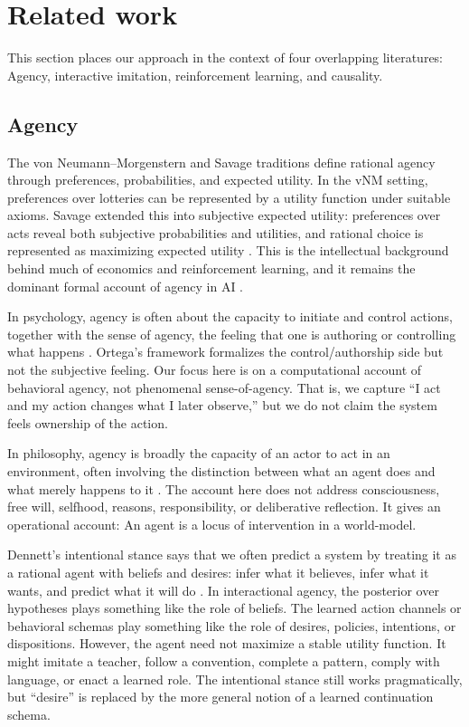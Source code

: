 \documentclass[11pt]{article}
\begin{document}
\section{Related work}
\label{sec:relatedwork}

This section places our approach in the context of four overlapping literatures: Agency, interactive imitation, reinforcement learning, and causality.

\subsection{Agency}
\label{sec:rw-agency}

The von Neumann--Morgenstern and Savage traditions define rational agency through preferences, probabilities, and expected utility. In the vNM setting, preferences over lotteries can be represented by a utility function under suitable axioms. Savage extended this into subjective expected utility: preferences over acts reveal both subjective probabilities and utilities, and rational choice is represented as maximizing expected utility \citep{vonNeumannMorgenstern1944,savage1954,sepDecisionTheory,russell1997rationality}. This is the intellectual background behind much of economics and reinforcement learning, and it remains the dominant formal account of agency in AI \citep{russell2010artificial}.

In psychology, agency is often about the capacity to initiate and control actions, together with the sense of agency, the feeling that one is authoring or controlling what happens \citep{wikiAgencyPsychology,haggard2017sense}. Ortega's framework formalizes the control/authorship side but not the subjective feeling. Our focus here is on a computational account of behavioral agency, not phenomenal sense-of-agency. That is, we capture ``I act and my action changes what I later observe,'' but we do not claim the system feels ownership of the action.

In philosophy, agency is broadly the capacity of an actor to act in an environment, often involving the distinction between what an agent does and what merely happens to it \citep{wikiAgencyPhilosophy,schlosser2019agency}. The account here does not address consciousness, free will, selfhood, reasons, responsibility, or deliberative reflection. It gives an operational account: An agent is a locus of intervention in a world-model.

Dennett's intentional stance says that we often predict a system by treating it as a rational agent with beliefs and desires: infer what it believes, infer what it wants, and predict what it will do \citep{dennett1987intentional}. In interactional agency, the posterior over hypotheses plays something like the role of beliefs. The learned action channels or behavioral schemas play something like the role of desires, policies, intentions, or dispositions. However, the agent need not maximize a stable utility function. It might imitate a teacher, follow a convention, complete a pattern, comply with language, or enact a learned role. The intentional stance still works pragmatically, but ``desire'' is replaced by the more general notion of a learned continuation schema. 
\end{document}
